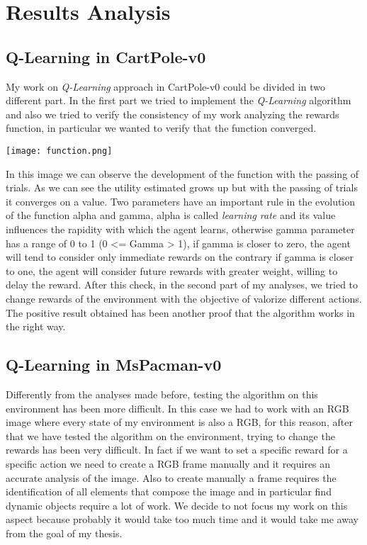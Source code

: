 \documentclass[]{report}
\begin{document}
\chapter{Results Analysis}

\section{Q-Learning in CartPole-v0}
My work on \emph{Q-Learning} approach in CartPole-v0 could be divided in two different part.
In the first part we tried to implement the \emph{Q-Learning} algorithm and also we tried to verify the consistency of my work analyzing the rewards function, in particular we wanted to verify that the function converged.

\vspace{10 mm}

\begin{center}
	\texttt{[image: function.png]}
\end{center} 

\vspace{20 mm}

In this image we can observe the development of the function with the passing of trials. As we can see the utility estimated grows up but with the passing of trials it converges on a value.
Two parameters have an important rule in the evolution of the function alpha and gamma, alpha is called \emph{learning rate} and its value influences the rapidity with which the agent learns, otherwise 
gamma parameter has a range of 0 to 1 (0 <= Gamma > 1), if gamma is closer to zero, the agent will tend to consider only immediate rewards on the contrary if gamma is closer to one, the agent will consider future rewards with greater weight, willing to delay the reward.
After this check, in the second part of my analyses, we tried to change rewards of the environment with the objective of valorize different actions.
The positive result obtained has been another proof that the algorithm works in the right way.

\section{Q-Learning in MsPacman-v0}
Differently from the analyses made before, testing the algorithm on this environment has been more difficult.
In this case we had to work with an RGB image where every state of my environment is also a RGB, for this reason, after that we have tested the algorithm on the environment, trying to change the rewards has been very difficult.
In fact if we want to set a specific reward for a specific action we need to create a RGB frame manually
and it requires an accurate analysis of the image.
Also to create manually a frame requires the identification of all elements that compose the image and in particular find dynamic objects require a lot of work.
We decide to not focus my work on this aspect because probably it would take too much time and it would take me away from the goal of my thesis.
\end{document}
